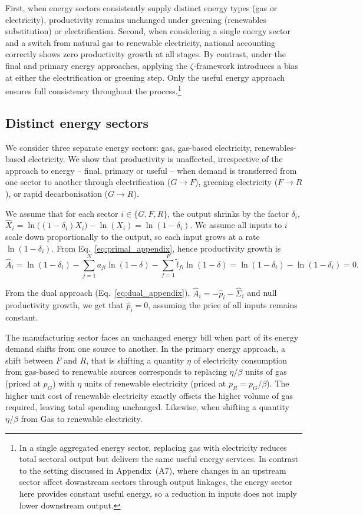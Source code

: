 \documentclass[11pt]{article}
\begin{document}
First, when energy sectors consistently supply distinct energy types (gas or electricity), productivity remains unchanged under greening (renewables substitution) or electrification.
Second, when considering a single energy sector and a switch from natural gas to renewable electricity, national accounting correctly shows zero productivity growth at all stages. By contrast, under the final and primary energy approaches, applying the $\zeta$-framework introduces a bias at either the electrification or greening step. Only the useful energy approach ensures full consistency throughout the process.\footnote{
In a single aggregated energy sector, replacing gas with electricity reduces total sectoral output but delivers the same useful energy services. In contrast to the setting discussed in Appendix~(A7), where changes in an upstream sector affect downstream sectors through output linkages, the energy sector here provides constant useful energy, so a reduction in inputs does not imply lower downstream output.
} 


\subsection{Distinct energy sectors}
\label{sect_energy3sectors}
We consider three separate energy sectors: gas, gas-based electricity, renewables-based electricity. We show that productivity is unaffected, irrespective of the approach to energy -- final, primary or useful -- when demand is transferred from one sector to another through  electrification ($G\rightarrow F$), greening electricity ($F\rightarrow R$), or rapid decarbonisation ($G\rightarrow R$).

We assume that for each sector $i\in\{G,F,R\}$, the output shrinks by the factor $\delta_i$,
$\hat{X}_i= \ln\bigl((1-\delta_i) X_i\bigr)  -  \ln(X_i)= \ln(1-\delta_i)$.
We assume all inputs to $i$ scale down proportionally to the output, so each input grows at a rate $\ln(1-\delta_i)$. From Eq.~\ref{eq:primal_appendix}, hence productivity growth is 
\[
    \hat{A}_i
= \ln(1-\delta_i)
  - \sum_{j=1}^N a_{ji}\ln(1-\delta)
  - \sum_{f=1}^F \tilde{l}_{fi}\ln(1-\delta)
= \ln(1-\delta_i)  -  \ln(1-\delta_i)
= 0.
\]

From the dual approach (Eq.~\ref{eq:dual_appendix}), $\hat{A}_i=-\hat{p}_i-\hat{\Sigma}_i$ and null productivity growth, we get that $\hat{p}_i=0$, assuming the price of all inputs remains constant. 

\vspace{3mm}
The manufacturing sector faces an unchanged energy bill when part of its energy demand shifts from one source to another. In the primary energy approach, a shift between $F$ and $R$, that is shifting a quantity $\eta$ of electricity consumption from gas-based to renewable sources corresponds to replacing $\eta/\beta$ units of gas (priced at $p_G$) with $\eta$ units of renewable electricity (priced at $p_R = p_G/\beta$). The higher unit cost of renewable electricity exactly offsets the higher volume of gas required, leaving total spending unchanged. Likewise, when shifting a quantity $\eta/\beta$ from Gas to renewable electricity.
\end{document}
